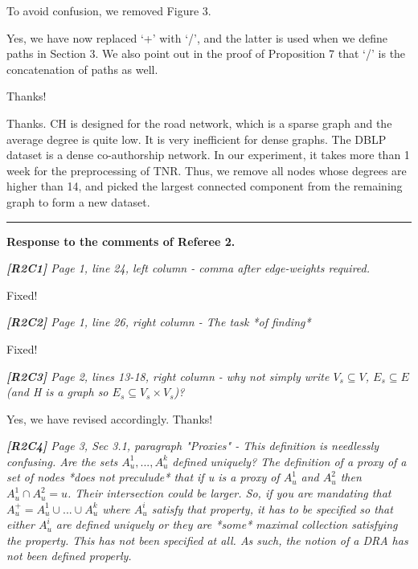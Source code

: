 \documentclass[11pt]{letter}
\newcommand{\vs}{\vspace{1ex}}
\newcommand{\svs}{\vspace{0.36ex}}
\begin{document}
\svs
To avoid confusion, we removed Figure 3.


\svs
Yes, we have now replaced `+' with `/', and the latter is used when we define paths in Section 3.
We also point out in the proof of Proposition 7 that `/' is the concatenation of paths as well.

Thanks!


\svs
Thanks. CH is designed for the road network, which is a sparse graph and the average degree is quite low. It is very inefficient for dense graphs. The DBLP dataset is a dense co-authorship network. In our experiment, it takes more than 1 week for the preprocessing of TNR. Thus, we remove all nodes whose degrees are higher than 14, and picked the largest connected component from the remaining graph to form a new dataset.





\vspace{2.8ex}
\hrule
\vspace{0.6ex}
{\bf Response to the comments of Referee 2.}



\vs
\noindent
{\em
{\bf [R2C1]}
 Page 1, line 24, left column - comma after edge-weights required.}
\svs

Fixed!

\vs
\noindent
{\em
{\bf [R2C2]} Page 1, line 26, right column - The task *of finding*}
\svs

Fixed!

\vs
\noindent
{\em
{\bf [R2C3]} Page 2, lines 13-18, right column - why not simply write $V_s \subseteq V$, $E_s \subseteq E$ (and H is a graph so $E_s \subseteq V_s \times V_s$)?
}
\svs

Yes, we have revised accordingly. Thanks!


\vs
\noindent
{\em{\bf[R2C4]} Page 3, Sec 3.1, paragraph "Proxies" - This definition is needlessly confusing. Are the sets $A_u^1, ..., A_u^k$ defined uniquely? The definition of a proxy of a set of nodes *does not preculude* that
if u is a proxy of $A_u^1$ and $A_u^2$ then $A_u^1 \cap A_u^2 = {u}$.
Their intersection could be larger. So, if you are mandating that
$A_u^+ = A_u^1 \cup ... \cup A_u^k$ where $A_u^i$ satisfy that property,
it has to be specified so that either $A_u^i$ are defined uniquely or
they are *some* maximal collection satisfying the property. This
has not been specified at all. As such, the notion of a DRA has
not been defined properly.}
\svs
\end{document}
